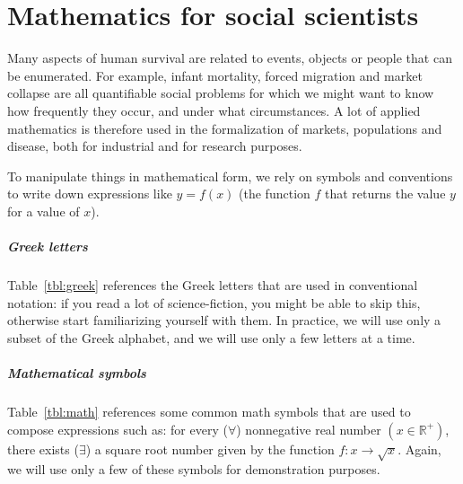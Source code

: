 %
%
\chapter[Mathematics]{Mathematics for social scientists}%
  \label{ch:math}%




Many aspects of human survival are related to events, objects or people that can be enumerated. For example, infant mortality, forced migration and market collapse are all quantifiable social problems for which we might want to know how frequently they occur, and under what circumstances. A lot of applied mathematics is therefore used in the formalization of markets, populations and disease, both for industrial and for research purposes.

To manipulate things in mathematical form, we rely on symbols and conventions to write down expressions like $y = f(x)$ (the function $f$ that returns the value $y$ for a value of $x$).

%
\paragraph{Greek letters}%
%
Table~\ref{tbl:greek} references the Greek letters that are used in conventional notation: if you read a lot of science-fiction, you might be able to skip this, otherwise start familiarizing yourself with them. In practice, we will use only a subset of the Greek alphabet, and we will use only a few letters at a time.




%
\paragraph{Mathematical symbols}%
%
Table~\ref{tbl:math} references some common math symbols that are used to compose expressions such as: for every ($\forall$) nonnegative real number $(x \in \mathbb{R}^{+})$, there exists ($\exists$) a square root number given by the function $f: x \rightarrow \sqrt{x}$. Again, we will use only a few of these symbols for demonstration purposes.

